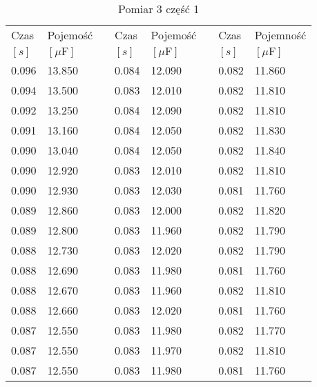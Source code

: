 \documentclass[12pt]{mwrep}
\begin{document}
	\begin{table}[H]\caption{Pomiar 3 część 1}\label{tab:3v1}
		\begin{tabularx}{\textwidth}{|Y|Y|p{2mm}|Y|Y|p{2mm}|Y|Y|}
			Czas & Pojemość && Czas & Pojemość && Czas & Pojemność \\
			$[s]$ & $[\mu\text{F}]$ && $[s]$ & $[\mu\text{F}]$ && $[s]$ & $[\mu\text{F}]$ \\
			0.096 & 13.850 && 0.084 & 12.090 && 0.082 & 11.860 \\
			0.094 & 13.500 && 0.083 & 12.010 && 0.082 & 11.810 \\
			0.092 & 13.250 && 0.084 & 12.090 && 0.082 & 11.810 \\
			0.091 & 13.160 && 0.084 & 12.050 && 0.082 & 11.830 \\
			0.090 & 13.040 && 0.084 & 12.050 && 0.082 & 11.840 \\
			0.090 & 12.920 && 0.083 & 12.010 && 0.082 & 11.810 \\
			0.090 & 12.930 && 0.083 & 12.030 && 0.081 & 11.760 \\
			0.089 & 12.860 && 0.083 & 12.000 && 0.082 & 11.820 \\
			0.089 & 12.800 && 0.083 & 11.960 && 0.082 & 11.790 \\
			0.088 & 12.730 && 0.083 & 12.020 && 0.082 & 11.790 \\
			0.088 & 12.690 && 0.083 & 11.980 && 0.081 & 11.760 \\
			0.088 & 12.670 && 0.083 & 11.960 && 0.082 & 11.810 \\
			0.088 & 12.660 && 0.083 & 12.020 && 0.081 & 11.760 \\
			0.087 & 12.550 && 0.083 & 11.980 && 0.082 & 11.770 \\
			0.087 & 12.550 && 0.083 & 11.970 && 0.082 & 11.810 \\
			0.087 & 12.550 && 0.083 & 11.980 && 0.081 & 11.760 \\

\end{tabularx}
\end{table}
\end{document}
